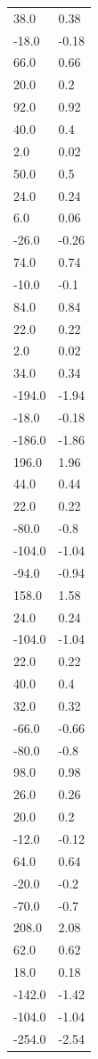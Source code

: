 \begin{longtable}{ll}
38.0 & 0.38 \\
-18.0 & -0.18 \\
66.0 & 0.66 \\
20.0 & 0.2 \\
92.0 & 0.92 \\
40.0 & 0.4 \\
2.0 & 0.02 \\
50.0 & 0.5 \\
24.0 & 0.24 \\
6.0 & 0.06 \\
-26.0 & -0.26 \\
74.0 & 0.74 \\
-10.0 & -0.1 \\
84.0 & 0.84 \\
22.0 & 0.22 \\
2.0 & 0.02 \\
34.0 & 0.34 \\
-194.0 & -1.94 \\
-18.0 & -0.18 \\
-186.0 & -1.86 \\
196.0 & 1.96 \\
44.0 & 0.44 \\
22.0 & 0.22 \\
-80.0 & -0.8 \\
-104.0 & -1.04 \\
-94.0 & -0.94 \\
158.0 & 1.58 \\
24.0 & 0.24 \\
-104.0 & -1.04 \\
22.0 & 0.22 \\
40.0 & 0.4 \\
32.0 & 0.32 \\
-66.0 & -0.66 \\
-80.0 & -0.8 \\
98.0 & 0.98 \\
26.0 & 0.26 \\
20.0 & 0.2 \\
-12.0 & -0.12 \\
64.0 & 0.64 \\
-20.0 & -0.2 \\
-70.0 & -0.7 \\
208.0 & 2.08 \\
62.0 & 0.62 \\
18.0 & 0.18 \\
-142.0 & -1.42 \\
-104.0 & -1.04 \\
-254.0 & -2.54 \\

\end{longtable}
